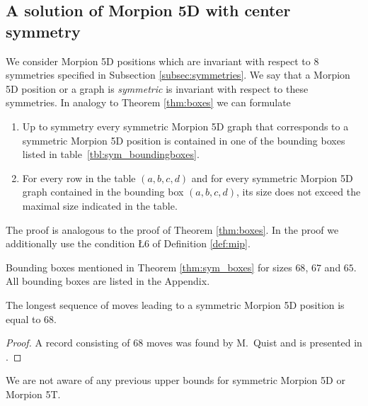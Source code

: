 \subsection{A solution of Morpion 5D with center symmetry}
We consider Morpion 5D positions which are invariant with respect to $8$ symmetries 
specified in Subsection \ref{subsec:symmetries}. We say that a Morpion 5D position or a graph is {\em symmetric} is invariant with respect to these symmetries.  
In analogy to Theorem \ref{thm:boxes} we can formulate 
\begin{theorem}
\begin{enumerate}
\item Up to symmetry every symmetric Morpion 5D graph that corresponds to a symmetric Morpion 5D position
    is contained in one of the bounding boxes listed in table~\ref{tbl:sym_boundingboxes}.
\item For every row in the table $(a,b,c,d)$ and for every symmetric Morpion 5D graph contained in the bounding box  $(a,b,c,d)$,
its size does not exceed the maximal size indicated in the table.
\end{enumerate} 
\label{thm:sym_boxes}
\end{theorem}

The proof is analogous to the proof of Theorem \ref{thm:boxes}. In the proof we additionally use the condition \L{6} of Definition \ref{def:mip}.

\begin{table}[ht]
\centering
 

\caption{Bounding boxes mentioned in Theorem \ref{thm:sym_boxes} for sizes $68$, $67$ and $65$. All bounding boxes are listed in the Appendix. }
\label{tbl:sym_boundingboxes}
\end{table}

\begin{corollary}
\label{cor:68}
The longest sequence of moves leading to a symmetric Morpion 5D position is equal to $68$.
\end{corollary}
\begin{proof} 
A record consisting of $68$ moves was found by M.~Quist and is presented in \cite{boyer}. 
\end{proof}

We are not aware of any previous upper bounds for symmetric Morpion 5D or Morpion 5T.

